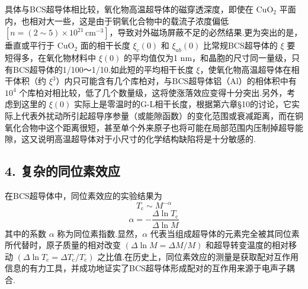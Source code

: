 具体与BCS超导体相比较，氧化物高温超导体的磁穿透深度，即使在 $\mathrm{CuO}_{2}$ 平面内，也相对大一些，这是由于铜氧化合物中的载流子浓度偏低 $\left[n=\left(2\sim5\right)\times10^{21}\,\mathrm{cm}^{-3}\right]$，导致对外磁场屏蔽不足的必然结果.更为突出的是，垂直或平行于 $\mathrm{CuO}_{2}$ 面的相干长度 $\xi_{c}(0)$ 和 $\xi_{ab}(0)$ 比常规BCS超导体的 $\xi$ 要短得多，在氧化物材料中 $\xi(0)$ 的平均值仅为1 nm，和晶胞的尺寸同一量级，只有BCS超导体的1/100～1/10.如此短的平均相干长度 $\xi$，使氧化物高温超导体在相干体积（约 $\xi^{3}$）内只可能含有几个库柏对，与BCS超导体铝（Al）的相体积中有 $10^{4}$ 个库柏对相比较，低了几个数量级，这将使涨落效应变得十分突出.另外，考虑到这里的 $\xi(0)$ 实际上是零温时的G-L相干长度，根据第六章§10的讨论，它实际上代表外扰动所引起超导序参量（或能隙函数）的变化范围或衰减距离，而在铜氧化合物中这个距离很短，甚至单个外来原子也将可能在局部范围内压制掉超导能隙，这又说明高温超导体对于小尺寸的化学结构缺陷将是十分敏感的.

\subsection*{4. 复杂的同位素效应}

在BCS超导体中，同位素效应的实验结果为
\begin{equation}
  T_{\mathrm{c}}\sim M^{-\alpha}
\end{equation}
\begin{equation}
  \alpha=-\frac{\Delta\ln T_{\mathrm{c}}}{\Delta\ln M}
\end{equation}
其中的系数 $\alpha$ 称为同位素指数.显然，$\alpha$ 代表当组成超导体的元素完全被其同位素所代替时，原子质量的相对改变 $\left(\Delta\ln M=\Delta M/M\right)$ 和超导转变温度的相对移动 $\left(\Delta\ln T_{\mathrm{c}}=\Delta T_{\mathrm{c}}/T_{\mathrm{c}}\right)$ 之比值.在历史上，同位素效应的测量是获取配对互作用信息的有力工具，并成功地证实了BCS超导体形成配对的互作用来源于电声子耦合.


